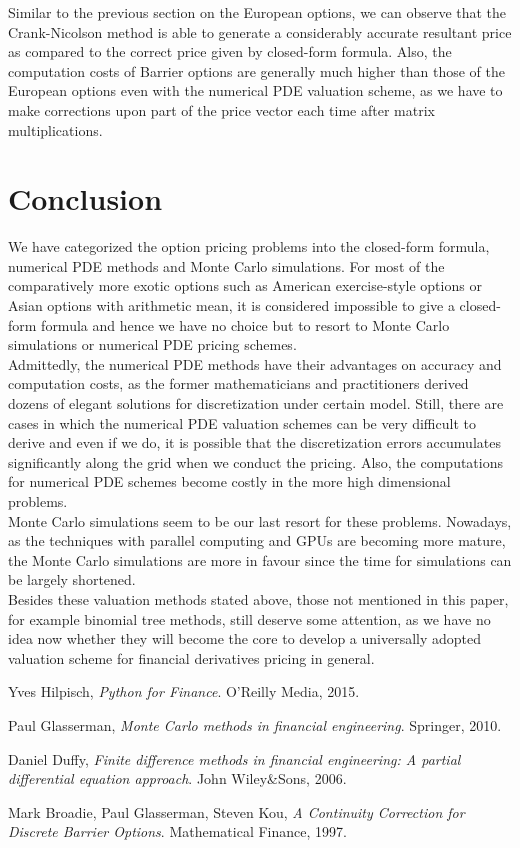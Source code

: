Similar to the previous section on the European options, we can observe that the Crank-Nicolson method is able to generate a considerably accurate resultant price as compared to the correct price given by closed-form formula. Also, the computation costs of Barrier options are generally much higher than those of the European options even with the numerical PDE valuation scheme, as we have to make corrections upon part of the price vector each time after matrix multiplications.
\newpage

\section{Conclusion}
We have categorized the option pricing problems into the closed-form formula, numerical PDE methods and Monte Carlo simulations. For most of the comparatively more exotic options such as American exercise-style options or Asian options with arithmetic mean, it is considered impossible to give a closed-form formula and hence we have no choice but to resort to Monte Carlo simulations or numerical PDE pricing schemes.\\[1mm]
Admittedly, the numerical PDE methods have their advantages on accuracy and computation costs, as the former mathematicians and practitioners derived dozens of elegant solutions for discretization under certain model. Still, there are cases in which the numerical PDE valuation schemes can be very difficult to derive and even if we do, it is possible that the discretization errors accumulates significantly along the grid when we conduct the pricing. Also, the computations for numerical PDE schemes become costly in the more high dimensional problems.\\[1mm]
Monte Carlo simulations seem to be our last resort for these problems. Nowadays, as the techniques with parallel computing and GPUs are becoming more mature, the Monte Carlo simulations are more in favour since the time for simulations can be largely shortened.\\[1mm]
Besides these valuation methods stated above, those not mentioned in this paper, for example binomial tree methods, still deserve some attention, as we have no idea now whether they will become the core to develop a universally adopted valuation scheme for financial derivatives pricing in general.

\newpage
\begin{thebibliography}{9}
Yves Hilpisch,
\textit{Python for Finance}. 
O'Reilly Media, 2015.
 
Paul Glasserman,
\textit{Monte Carlo methods in financial engineering}.
Springer, 2010.

Daniel Duffy,
\textit{Finite difference methods in financial engineering: A partial differential equation approach}.
John Wiley\&Sons, 2006.

Mark Broadie, Paul Glasserman, Steven Kou,
\textit{A Continuity Correction for Discrete Barrier Options}.
Mathematical Finance, 1997.

\end{thebibliography}
